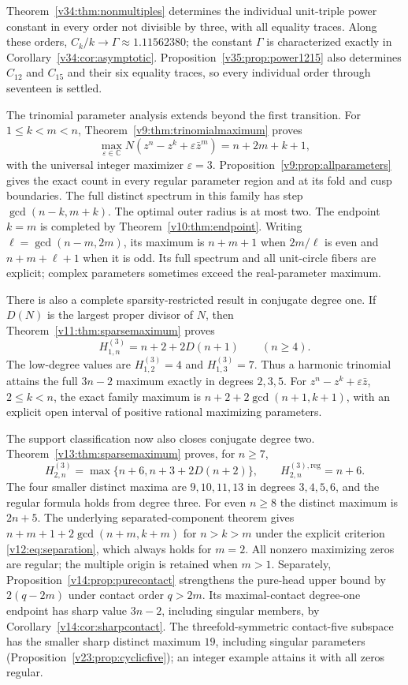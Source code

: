 \documentclass[UTF8,11pt]{ctexart}
\theoremstyle{definition}
\numberwithin{equation}{section}
\newcommand{\C}{\mathbb C}\newcommand{\R}{\mathbb R}
\begin{document}
Theorem~\ref{v34:thm:nonmultiples} determines the individual
unit-triple power constant in every order not divisible by three,
with all equality traces. Along these orders,
$C_k/k\to\Gamma\approx1.11562380$; the constant $\Gamma$
is characterized exactly in Corollary~\ref{v34:cor:asymptotic}. Proposition~\ref{v35:prop:power1215} also determines
$C_{12}$ and $C_{15}$ and their six equality traces, so every
individual order through seventeen is settled.

The trinomial parameter analysis extends beyond the first transition.
For $1\le k<m<n$, Theorem~\ref{v9:thm:trinomialmaximum} proves
\[
 \max_{\varepsilon\in\C}N(z^n-z^k+\varepsilon\bar z^m)
 =n+2m+k+1,
\]
with the universal integer maximizer $\varepsilon=3$.
Proposition~\ref{v9:prop:allparameters} gives the exact count in
every regular parameter region and at its fold and cusp boundaries.
The full distinct spectrum in this family has step
$\gcd(n-k,m+k)$. The optimal outer radius is at most two.
The endpoint $k=m$ is completed by Theorem~\ref{v10:thm:endpoint}.
Writing $\ell=\gcd(n-m,2m)$, its maximum is $n+m+1$ when
$2m/\ell$ is even and $n+m+\ell+1$ when it is odd.
Its full spectrum and all unit-circle fibers are explicit;
complex parameters sometimes exceed the real-parameter maximum.

There is also a complete sparsity-restricted result in conjugate
degree one. If $D(N)$ is the largest proper divisor of $N$, then
Theorem~\ref{v11:thm:sparsemaximum} proves
\[
 H^{(3)}_{1,n}=n+2+2D(n+1)\qquad(n\ge4).
\]
The low-degree values are $H^{(3)}_{1,2}=4$ and $H^{(3)}_{1,3}=7$.
Thus a harmonic trinomial attains the full $3n-2$ maximum exactly
in degrees $2,3,5$. For $z^n-z^k+\varepsilon\bar z$, $2\le k<n$,
the exact family maximum is $n+2+2\gcd(n+1,k+1)$, with an explicit
open interval of positive rational maximizing parameters.

The support classification now also closes conjugate degree two.
Theorem~\ref{v13:thm:sparsemaximum} proves, for $n\ge7$,
\[
 H^{(3)}_{2,n}=\max\{n+6,n+3+2D(n+2)\},\qquad
 H^{(3),\mathrm{reg}}_{2,n}=n+6.
\]
The four smaller distinct maxima are $9,10,11,13$ in degrees
$3,4,5,6$, and the regular formula holds from degree three.
For even $n\ge8$ the distinct maximum is $2n+5$.
The underlying separated-component theorem gives
$n+m+1+2\gcd(n+m,k+m)$ for $n>k>m$ under the explicit
criterion \eqref{v12:eq:separation}, which always holds for $m=2$.
All nonzero maximizing zeros are regular; the multiple origin
is retained when $m>1$. Separately,
Proposition~\ref{v14:prop:purecontact} strengthens the pure-head
upper bound by $2(q-2m)$ under contact order $q>2m$.
Its maximal-contact degree-one endpoint has sharp value $3n-2$,
including singular members, by Corollary~\ref{v14:cor:sharpcontact}.
The threefold-symmetric contact-five subspace has the smaller sharp
distinct maximum $19$, including singular parameters
(Proposition~\ref{v23:prop:cyclicfive}); an integer example attains it
with all zeros regular.
\end{document}
